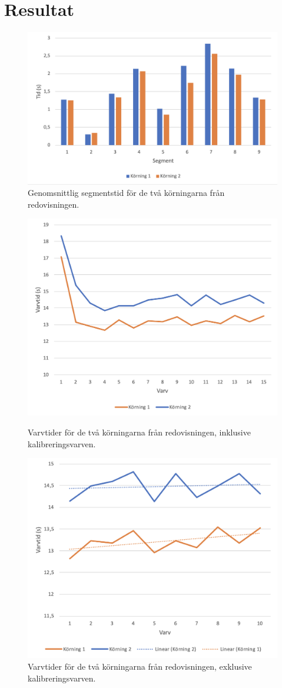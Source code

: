 \section{Resultat}

\begin{figure}
	\centering
	\includegraphics[width=0.5\linewidth]{Figures/segment_times}
	\caption{Genomsnittlig segmentstid för de två körningarna från redovisningen.}
	\label{fig:seg_times}
\end{figure}

\begin{figure}
  \centering
  \includegraphics[width=0.45\linewidth]{Figures/lap_times_with_calibration}
  \caption{Varvtider för de två körningarna från redovisningen, inklusive
	kalibreringsvarven.}

	\vspace*{\floatsep}%

	\includegraphics[width=0.45\linewidth]{Figures/lap_times_without_calibration}
	\caption{Varvtider för de två körningarna från redovisningen, exklusive
	kalibreringsvarven.}
\end{figure}
